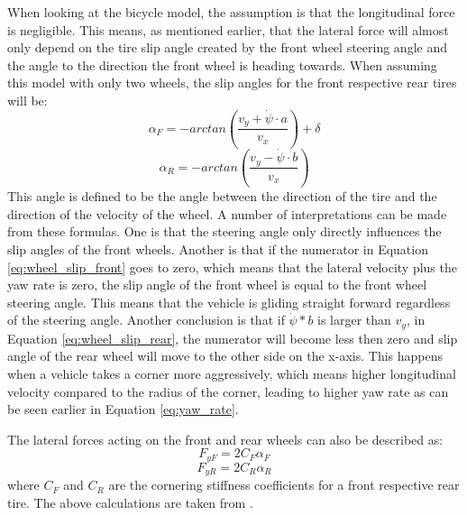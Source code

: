 When looking at the bicycle model, the assumption is that the longitudinal force is negligible. This means, as mentioned earlier, that the lateral force will almost only depend on the tire slip angle created by the front wheel steering angle and the angle to the direction the front wheel is heading towards. When assuming this model with only two wheels, the slip angles for the front respective rear tires will be:
\begin{equation} \label{eq:wheel_slip_front}
	\alpha _{F} = -arctan(\dfrac{v_{y} + \dot \psi  \cdot a}{v_{x}}) + \delta
\end{equation}
\begin{equation} \label{eq:wheel_slip_rear}
\alpha _{R} = -arctan(\dfrac{v_{y} - \dot \psi  \cdot b}{v_{x}})
\end{equation}
This angle is defined to be the angle between the direction of the tire and the direction of the velocity of the wheel. A number of interpretations can be made from these formulas. One is that the steering angle only directly influences the slip angles of the front wheels. Another is that if the numerator in Equation \ref{eq:wheel_slip_front} goes to zero, which means that the lateral velocity plus the yaw rate is zero, the slip angle of the front wheel is equal to the front wheel steering angle. This means that the vehicle is gliding straight forward regardless of the steering angle. Another conclusion is that if $ \dot \psi *b $ is larger than $ v_{y} $, in Equation \ref{eq:wheel_slip_rear}, the numerator will become less then zero and slip angle of the rear wheel will move to the other side on the x-axis. This happens when a vehicle takes a corner more aggressively, which means higher longitudinal velocity compared to the radius of the corner, leading to higher yaw rate as can be seen earlier in Equation \ref{eq:yaw_rate}.

The lateral forces acting on the front and rear wheels can also be described as: 
\begin{equation}
	F_{yF} = 2C_{F}\alpha _{F}
\end{equation}
\begin{equation}
	F_{yR} = 2C_{R}\alpha _{R}
\end{equation}
where $ C_{F} $ and $ C_{R} $ are the cornering stiffness coefficients for a front respective rear tire. The above calculations are taken from \cite{rajamani}. 

